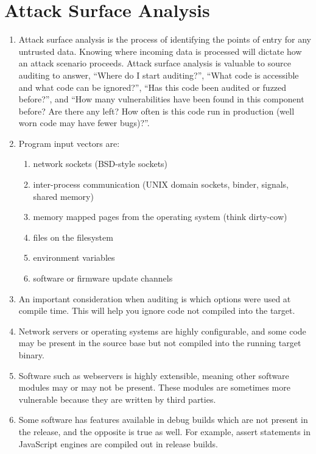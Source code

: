 \documentclass[12pt]{Training}
\begin{document}
\section*{Attack Surface Analysis}
\begin{enumerate}
	\item Attack surface analysis is the process of identifying the points of entry for any untrusted data. Knowing where incoming data is processed will dictate how an attack scenario proceeds. Attack surface analysis is valuable to source auditing to answer, ``Where do I start auditing?'', ``What code is accessible and what code can be ignored?'', ``Has this code been audited or fuzzed before?'', and ``How many vulnerabilities have been found in this component before? Are there any left? How often is this code run in production (well worn code may have fewer bugs)?''.
	\item Program input vectors are:
 		\begin{enumerate}
			\item network sockets (BSD-style sockets)
			\item inter-process communication (UNIX domain sockets, binder, signals, shared memory)
			\item memory mapped pages from the operating system (think dirty-cow)
			\item files on the filesystem
			\item environment variables
			\item software or firmware update channels
 		\end{enumerate}
	\item An important consideration when auditing is which options were used at compile time. This will help you ignore code not compiled into the target.
	\item Network servers or operating systems are highly configurable, and some code may be present in the source base but not compiled into the running target binary.
	\item Software such as webservers is highly extensible, meaning other software modules may or may not be present. These modules are sometimes more vulnerable because they are written by third parties.
	\item Some software has features available in debug builds which are not present in the release, and the opposite is true as well. For example, assert statements in JavaScript engines are compiled out in release builds.
\end{enumerate}
\end{document}
